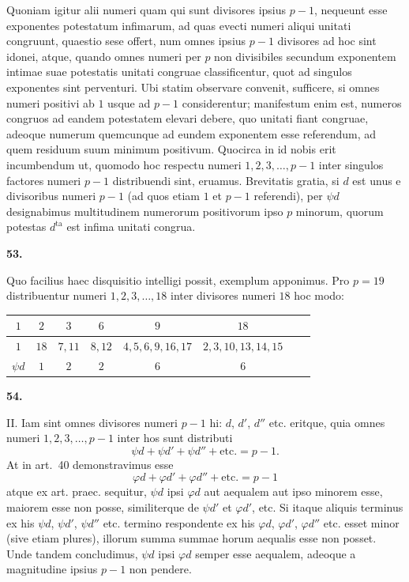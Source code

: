 \documentclass[12pt,a4paper]{article}
\theoremstyle{plain}
\theoremstyle{definition}
\theoremstyle{remark}
\begin{document}
Quoniam igitur alii numeri quam qui sunt divisores ipsius $p-1$, nequeunt esse exponentes potestatum infimarum, ad quas evecti numeri aliqui unitati congruunt, quaestio sese offert, num omnes ipsius $p-1$ divisores ad hoc sint idonei, atque, quando omnes numeri per $p$ non divisibiles secundum exponentem intimae suae potestatis unitati congruae classificentur, quot ad singulos exponentes sint perventuri. Ubi statim observare convenit, sufficere, si omnes numeri positivi ab $1$ usque ad $p-1$ considerentur; manifestum enim est, numeros congruos ad eandem potestatem elevari debere, quo unitati fiant congruae, adeoque numerum quemcunque ad eundem exponentem esse referendum, ad quem residuum suum minimum positivum. Quocirca in id nobis erit incumbendum ut, quomodo hoc respectu numeri $1, 2, 3, \ldots, p-1$ inter singulos factores numeri $p-1$ distribuendi sint, eruamus. Brevitatis gratia, si $d$ est unus e divisoribus numeri $p-1$ (ad quos etiam $1$ et $p-1$ referendi), per $\psi d$ designabimus multitudinem numerorum positivorum ipso $p$ minorum, quorum potestas $d^\text{ta}$ est infima unitati congrua.

\setcounter{satz}{53}
\addtocounter{satz}{-1}
\textbf{53.}

Quo facilius haec disquisitio intelligi possit, exemplum apponimus. Pro $p=19$ distribuentur numeri $1, 2, 3, \ldots, 18$ inter divisores numeri $18$ hoc modo:
\begin{center}
\begin{tabular}{c|ccccccc}
$1$ & $2$ & $3$ & $6$ & $9$ & $18$ \\
\hline
$1$ & $18$ & $7,11$ & $8,12$ & $4,5,6,9,16,17$ & $2,3,10,13,14,15$ \\
$\psi d$ & $1$ & $2$ & $2$ & $6$ & $6$
\end{tabular}
\end{center}

\setcounter{satz}{54}
\addtocounter{satz}{-1}
\textbf{54.}

II. Iam sint omnes divisores numeri $p-1$ hi: $d$, $d'$, $d''$ etc. eritque, quia omnes numeri $1, 2, 3, \ldots, p-1$ inter hos sunt distributi
\[\psi d + \psi d' + \psi d'' + \text{etc.} = p-1.\]
At in art.~40 demonstravimus esse
\[\varphi d + \varphi d' + \varphi d'' + \text{etc.} = p-1\]
atque ex art. praec. sequitur, $\psi d$ ipsi $\varphi d$ aut aequalem aut ipso minorem esse, maiorem esse non posse, similiterque de $\psi d'$ et $\varphi d'$, etc. Si itaque aliquis terminus ex his $\psi d$, $\psi d'$, $\psi d''$ etc. termino respondente ex his $\varphi d$, $\varphi d'$, $\varphi d''$ etc. esset minor (sive etiam plures), illorum summa summae horum aequalis esse non posset. Unde tandem concludimus, $\psi d$ ipsi $\varphi d$ semper esse aequalem, adeoque a magnitudine ipsius $p-1$ non pendere.
\end{document}
